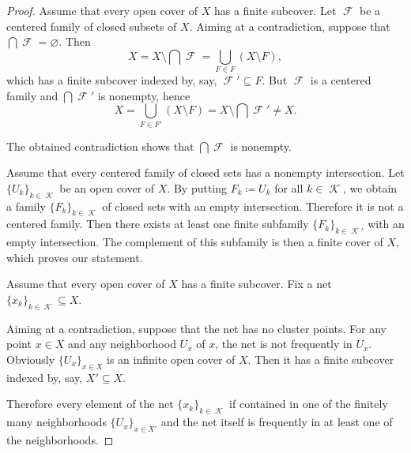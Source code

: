 \begin{proof}
   Assume that every open cover of \( X \) has a finite subcover. Let \( \mscrF \) be a centered family of closed subsets of \( X \). Aiming at a contradiction, suppose that \( \bigcap \mscrF = \varnothing \). Then
  \begin{equation*}
    X
    =
    X \setminus \bigcap \mscrF
    =
    \bigcup_{F \in F} (X \setminus F),
  \end{equation*}
  which has a finite subcover indexed by, say, \( \mscrF' \subseteq F \). But \( \mscrF \) is a centered family and \( \bigcap \mscrF' \) is nonempty, hence
  \begin{equation*}
    X
    =
    \bigcup_{F \in F'} (X \setminus F)
    =
    X \setminus \bigcap \mscrF'
    \neq
    X.
  \end{equation*}

  The obtained contradiction shows that \( \bigcap \mscrF \) is nonempty.

   Assume that every centered family of closed sets has a nonempty intersection. Let \( \{ U_k \}_{k \in \mscrK} \) be an open cover of \( X \). By putting \( F_k \coloneqq U_k \) for all \( k \in \mscrK \), we obtain a family \( \{ F_k \}_{k \in \mscrK} \) of closed sets with an empty intersection. Therefore it is not a centered family. Then there exists at least one finite subfamily \( \{ F_k \}_{k \in \mscrK'} \) with an empty intersection. The complement of this subfamily is then a finite cover of \( X \), which proves our statement.

   Assume that every open cover of \( X \) has a finite subcover. Fix a net \( \{ x_k \}_{k \in \mscrK} \subseteq X \).

  Aiming at a contradiction, suppose that the net has no cluster points. For any point \( x \in X \) and any neighborhood \( U_x \) of \( x \), the net is not frequently in \( U_x \). Obviously \( \{ U_x \}_{x \in X} \) is an infinite open cover of \( X \). Then it has a finite subcover indexed by, say, \( X' \subseteq X \).

  Therefore every element of the net \( \{ x_k \}_{k \in \mscrK} \) if contained in one of the finitely many neighborhoods \( \{ U_x \}_{x \in X'} \) and the net itself is frequently in at least one of the neighborhoods.


\end{proof}
